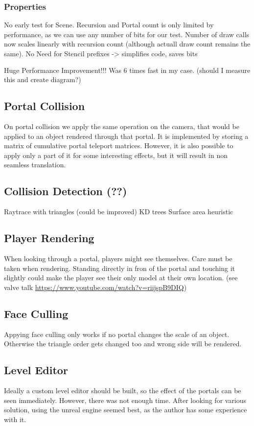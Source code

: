 \subsubsection{Properties}
No early test for Scene.
Recursion and Portal count is only limited by performance, as we can use any number of bits for our test.
Number of draw calls now scales linearly with recursion count (although actuall draw count remains the same).
No Need for Stencil prefixes -> simplifies code, saves bits

Huge Performance Improvement!!! Was 6 times fast in my case. 
(should I measure this and create diagram?)




\subsection{Portal Collision}
On portal collision we apply the same operation on the camera, that would be applied to an object rendered through that portal.
It is implemented by storing a matrix of cumulative portal teleport matrices.
However, it is also possible to apply only a part of it for some interesting effects, but it will result in non seamless translation.

\subsection{Collision Detection (??)}
Raytrace with triangles (could be improved)
KD trees
Surface area heuristic

\subsection{Player Rendering}
When looking through a portal, players might see themselves. Care must be taken when rendering. Standing directly in fron of the portal and touching it slightly could make the player see their only model at their own location. (see valve talk \url{https://www.youtube.com/watch?v=riijspB9DIQ})



\subsection{Face Culling}
Appying face culling only works if no portal changes the scale of an object. Otherwise the triangle order gets changed too and wrong side will be rendered.

\subsection{Level Editor}
Ideally a custom level editor should be built, so the effect of the portals can be seen immediately. However, there was not enough time. After looking for various solution, using the unreal engine seemed best, as the author has some experience with it.

